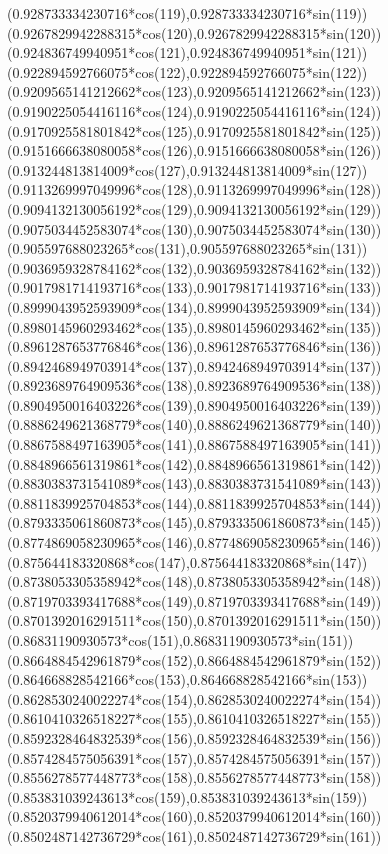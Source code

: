 {({0.928733334230716*cos(119)},{0.928733334230716*sin(119)})
({0.9267829942288315*cos(120)},{0.9267829942288315*sin(120)})
({0.924836749940951*cos(121)},{0.924836749940951*sin(121)})
({0.922894592766075*cos(122)},{0.922894592766075*sin(122)})
({0.9209565141212662*cos(123)},{0.9209565141212662*sin(123)})
({0.9190225054416116*cos(124)},{0.9190225054416116*sin(124)})
({0.9170925581801842*cos(125)},{0.9170925581801842*sin(125)})
({0.9151666638080058*cos(126)},{0.9151666638080058*sin(126)})
({0.913244813814009*cos(127)},{0.913244813814009*sin(127)})
({0.9113269997049996*cos(128)},{0.9113269997049996*sin(128)})
({0.9094132130056192*cos(129)},{0.9094132130056192*sin(129)})
({0.9075034452583074*cos(130)},{0.9075034452583074*sin(130)})
({0.905597688023265*cos(131)},{0.905597688023265*sin(131)})
({0.9036959328784162*cos(132)},{0.9036959328784162*sin(132)})
({0.9017981714193716*cos(133)},{0.9017981714193716*sin(133)})
({0.8999043952593909*cos(134)},{0.8999043952593909*sin(134)})
({0.8980145960293462*cos(135)},{0.8980145960293462*sin(135)})
({0.8961287653776846*cos(136)},{0.8961287653776846*sin(136)})
({0.8942468949703914*cos(137)},{0.8942468949703914*sin(137)})
({0.8923689764909536*cos(138)},{0.8923689764909536*sin(138)})
({0.8904950016403226*cos(139)},{0.8904950016403226*sin(139)})
({0.8886249621368779*cos(140)},{0.8886249621368779*sin(140)})
({0.8867588497163905*cos(141)},{0.8867588497163905*sin(141)})
({0.8848966561319861*cos(142)},{0.8848966561319861*sin(142)})
({0.8830383731541089*cos(143)},{0.8830383731541089*sin(143)})
({0.8811839925704853*cos(144)},{0.8811839925704853*sin(144)})
({0.8793335061860873*cos(145)},{0.8793335061860873*sin(145)})
({0.8774869058230965*cos(146)},{0.8774869058230965*sin(146)})
({0.875644183320868*cos(147)},{0.875644183320868*sin(147)})
({0.8738053305358942*cos(148)},{0.8738053305358942*sin(148)})
({0.8719703393417688*cos(149)},{0.8719703393417688*sin(149)})
({0.8701392016291511*cos(150)},{0.8701392016291511*sin(150)})
({0.86831190930573*cos(151)},{0.86831190930573*sin(151)})
({0.8664884542961879*cos(152)},{0.8664884542961879*sin(152)})
({0.864668828542166*cos(153)},{0.864668828542166*sin(153)})
({0.8628530240022274*cos(154)},{0.8628530240022274*sin(154)})
({0.8610410326518227*cos(155)},{0.8610410326518227*sin(155)})
({0.8592328464832539*cos(156)},{0.8592328464832539*sin(156)})
({0.8574284575056391*cos(157)},{0.8574284575056391*sin(157)})
({0.8556278577448773*cos(158)},{0.8556278577448773*sin(158)})
({0.853831039243613*cos(159)},{0.853831039243613*sin(159)})
({0.8520379940612014*cos(160)},{0.8520379940612014*sin(160)})
({0.8502487142736729*cos(161)},{0.8502487142736729*sin(161)})
}
